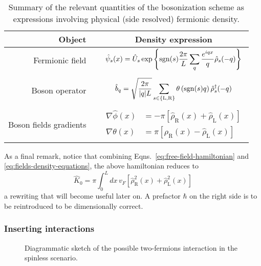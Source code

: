\begin{table}
	\centering
	\begin{tabular}{r c c}
		Object && Density expression\\
		\midrule
		Fermionic field && $\displaystyle \hat \psi_s (x) = \hat U_s \exp\left\{ \mathrm{sgn}(s) \frac{2\pi}{L} \sum_q \frac{e^{iqx}}{q} \hat \rho_s (-q) \right\}$ \\
		&&\\
		Boson operator && $\displaystyle \hat b_q = \sqrt{\frac{2\pi}{\abs{q}L}} \sum_{s \in \left\{\mathrm L, \mathrm R\right\}} \theta \left(\mathrm{sgn}(s) q\right) \hat \rho_s^\dagger (-q)$ \\
		&&\\ 
		Boson fields gradients && $\displaystyle \begin{aligned}
			\nabla \hat \phi(x) &= - \pi \left[ \hat \rho_\mathrm{R}(x) + \hat \rho_\mathrm{L}(x) \right] \\ 
			\nabla \hat \theta(x) &= \pi \left[ \hat \rho_\mathrm{R}(x) - \hat \rho_\mathrm{L}(x) \right]
		\end{aligned}$
	\end{tabular}
	\caption{Summary of the relevant quantities of the bosonization scheme as expressions involving physical (side resolved) fermionic density.}
	\label{tab:bosonization-formulas}
\end{table}

As a final remark, notice that combining Eqns.~\eqref{eq:free-field-hamiltonian} and \eqref{eq:fields-density-equations}, the above hamiltonian reduces to
\begin{equation}\label{eq:free-field-hamiltonian-density-integral}
	\hat K_0 = \pi \int_0^L dx \, v_F \left[  
		\hat \rho_\mathrm{R}^2 (x) + \hat \rho_\mathrm{L}^2 (x)
	\right]
\end{equation}
a rewriting that will become useful later on. A prefactor $\hbar$ on the right side is to be reintroduced to be dimensionally correct.

\subsubsection{Inserting interactions}

\begin{figure}
	\centering
	\subfloat[][$g_1 = V(q \approx \pm 2k_F)$ process.]{
		
		\label{fig:g1-process}
	}
	\subfloat[][$g_2 = V(q \approx 0)$ process.]{
		
		\label{fig:g2-process}
	}
	\subfloat[][$g_4 = V(q \approx 0)$ process.]{
		
		\label{fig:g4-process}
	}
	\caption{Diagrammatic sketch of the possible two-fermions interaction in the spinless scenario.}
	\label{fig:g-processes}
\end{figure}

